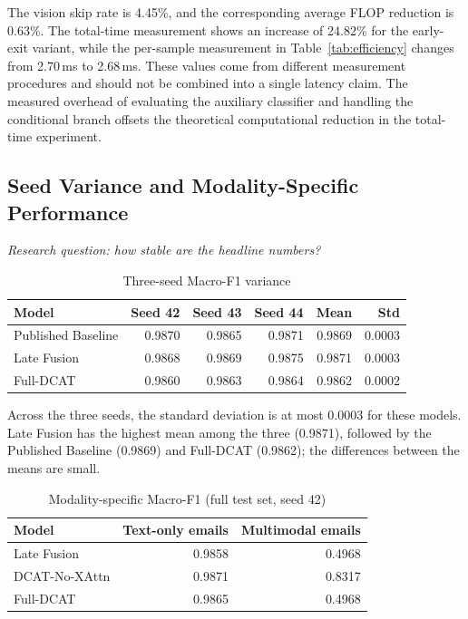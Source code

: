 \documentclass[10pt,twoside]{article}
\begin{document}
The vision skip rate is 4.45\%, and the corresponding average FLOP reduction is 0.63\%. The total-time measurement shows an increase of 24.82\% for the early-exit variant, while the per-sample measurement in Table~\ref{tab:efficiency} changes from 2.70\,ms to 2.68\,ms. These values come from different measurement procedures and should not be combined into a single latency claim. The measured overhead of evaluating the auxiliary classifier and handling the conditional branch offsets the theoretical computational reduction in the total-time experiment.

\subsection{Seed Variance and Modality-Specific Performance}\label{sec:seedvariance}

\emph{Research question: how stable are the headline numbers?}

\begin{table}[t]
\centering
\caption{Three-seed Macro-F1 variance}
\label{tab:seeds}
\small
\begin{tabular}{lrrrrr}
\toprule
Model & Seed 42 & Seed 43 & Seed 44 & Mean & Std \\
\midrule
Published Baseline & 0.9870 & 0.9865 & 0.9871 & 0.9869 & 0.0003 \\
Late Fusion & 0.9868 & 0.9869 & 0.9875 & 0.9871 & 0.0003 \\
Full-DCAT & 0.9860 & 0.9863 & 0.9864 & 0.9862 & 0.0002 \\
\bottomrule
\end{tabular}
\end{table}

Across the three seeds, the standard deviation is at most 0.0003 for these models. Late Fusion has the highest mean among the three (0.9871), followed by the Published Baseline (0.9869) and Full-DCAT (0.9862); the differences between the means are small.

\begin{table}[t]
\centering
\caption{Modality-specific Macro-F1 (full test set, seed 42)}
\label{tab:modality}
\small
\begin{tabular}{lrr}
\toprule
Model & Text-only emails & Multimodal emails \\
\midrule
Late Fusion & 0.9858 & 0.4968 \\
DCAT-No-XAttn & 0.9871 & 0.8317 \\
Full-DCAT & 0.9865 & 0.4968 \\
\bottomrule
\end{tabular}
\end{table}
\end{document}
